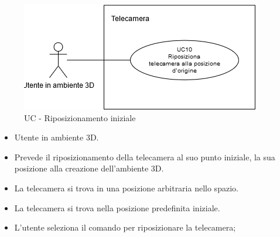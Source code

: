 \begin{figure}[h!]\centering
    \includegraphics[scale=0.7]{template/images/UC10.png}
    \caption{UC - Riposizionamento iniziale}
\end{figure}
\UCdsc
{ %
    \begin{itemize}
        \item Utente in ambiente 3D.
    \end{itemize}
}
{ %
    \begin{itemize}
        \item Prevede il riposizionamento della telecamera al suo punto iniziale, la sua posizione alla creazione dell'ambiente 3D.
    \end{itemize}
}
{ %
    \begin{itemize}
        \item La telecamera si trova in una posizione arbitraria nello spazio.
    \end{itemize}
}
{ %
    \begin{itemize}
        \item La telecamera si trova nella posizione predefinita iniziale.
    \end{itemize}
}
{ %
    \begin{itemize}
        \item L'utente seleziona il comando per riposizionare la telecamera;
    \end{itemize}
}

